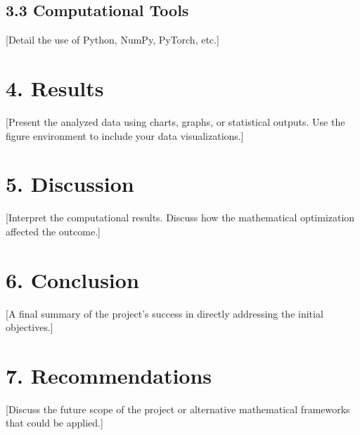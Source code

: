 \documentclass[12pt, a4paper]{report}
\begin{document}
\section*{3.3 Computational Tools}
[Detail the use of Python, NumPy, PyTorch, etc.]

\chapter*{4. Results}
[Present the analyzed data using charts, graphs, or statistical outputs. Use the figure environment to include your data visualizations.]


\chapter*{5. Discussion}
[Interpret the computational results. Discuss how the mathematical optimization affected the outcome.]

\chapter*{6. Conclusion}
[A final summary of the project's success in directly addressing the initial objectives.]

\chapter*{7. Recommendations}
[Discuss the future scope of the project or alternative mathematical frameworks that could be applied.]

\newpage
{}


\end{document}
